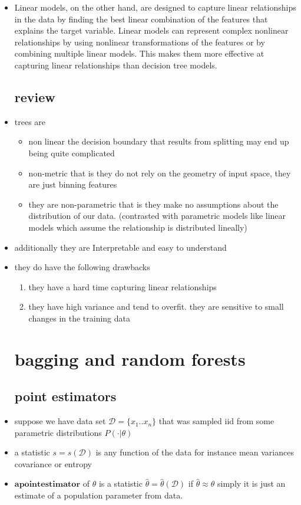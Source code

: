 \documentclass{article}
\begin{document}
\begin{itemize}
\item Linear models, on the other hand, are designed to capture linear relationships in the data by finding the best linear combination of the features that explains the target variable. Linear models can represent complex nonlinear relationships by using nonlinear transformations of the features or by combining multiple linear models. This makes them more effective at capturing linear relationships than decision tree models.
\subsection*{review}
\item trees are 
\begin{itemize}
    \item non linear the decision boundary that results from splitting may end up being quite complicated 
    \item non-metric that is they do not rely on the geometry of input space, they are just binning features
    \item they are non-parametric that is they make no assumptions about the distribution of our data. (contrasted with parametric models like linear models which assume the relationship is distributed lineally) 
\end{itemize}
\item additionally they are Interpretable and easy to understand 
\item they do have the following drawbacks
\begin{enumerate}
    \item they have a hard time capturing linear relationships
    \item they have high variance and tend to overfit. they are sensitive to small changes in the training data 
\end{enumerate}
\section*{bagging and random forests}
\subsection*{point estimators}
\item suppose we have data set $\mathcal{D}=\{x_1..x_n\}$ that was sampled iid from some parametric distributions $P(\cdot|\theta)$
\item a statistic $s=s(\mathcal{D})$ is any function of the data for instance mean variances covariance or entropy
\item $\mathbf{a point estimator}$ of $\theta$ is a statistic $\hat{\theta}=\hat{\theta}(\mathcal{D})$ if $\hat{\theta}\approx \theta$ simply it is just an estimate of a population parameter from data. 

\end{itemize}
\end{document}
